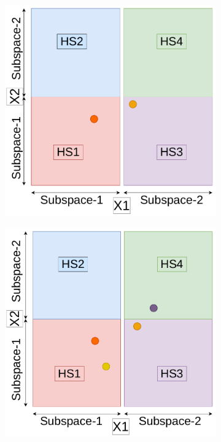 \begin{figure}[H]
\begin{subfigure}{0.45\textwidth}
		\caption{}
		\label{fig:dsbo-d}
	\end{subfigure}
	\begin{subfigure}{0.45\textwidth}
		\centering
		\includegraphics[scale=0.33]{figures/dbo/dbo-05.pdf}
		\caption{}
		\label{fig:dsbo-e}
	\end{subfigure}
	\begin{subfigure}{0.45\textwidth}
		\centering
		\includegraphics[scale=0.33]{figures/dbo/dbo-06.pdf}

\end{subfigure}
\end{figure}
